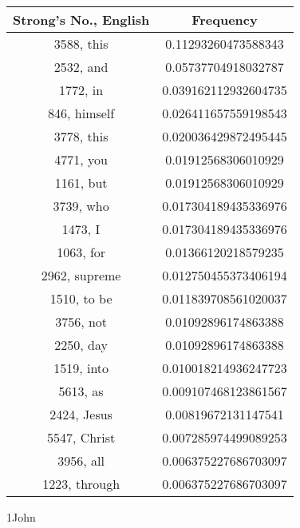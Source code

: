 \documentclass[12pt,letterpaper]{article}
\begin{document}
 \begin{longtable}{|c|c|}
\hline
 Strong's No., English & Frequency \\ \hline  
3588, this & 0.11293260473588343\\ \hline 
 2532, and & 0.05737704918032787\\ \hline 
 1772, in & 0.039162112932604735\\ \hline 
 846, himself & 0.026411657559198543\\ \hline 
 3778, this & 0.020036429872495445\\ \hline 
 4771, you & 0.01912568306010929\\ \hline 
 1161, but & 0.01912568306010929\\ \hline 
 3739, who & 0.017304189435336976\\ \hline 
 1473, I & 0.017304189435336976\\ \hline 
 1063, for & 0.01366120218579235\\ \hline 
 2962, supreme & 0.012750455373406194\\ \hline 
 1510, to be & 0.011839708561020037\\ \hline 
 3756, not & 0.01092896174863388\\ \hline 
 2250, day & 0.01092896174863388\\ \hline 
 1519, into & 0.010018214936247723\\ \hline 
 5613, as & 0.009107468123861567\\ \hline 
 2424, Jesus & 0.00819672131147541\\ \hline 
 5547, Christ & 0.007285974499089253\\ \hline 
 3956, all & 0.006375227686703097\\ \hline 
 1223, through & 0.006375227686703097\\ \hline 
\end{longtable} 
 

1John
\end{document}

